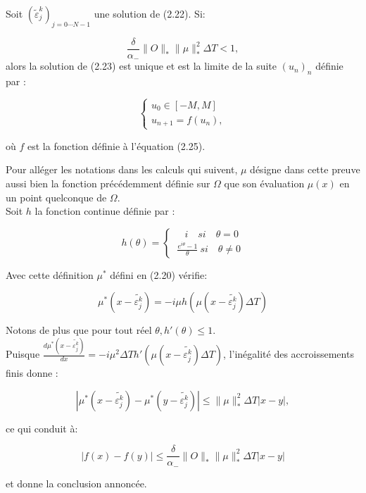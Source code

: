 \begin{theorem}
	Soit $(\tilde{\varepsilon}_j^k)_{j = 0\cdots N-1}$ une solution de (2.22). Si:
	
	\begin{equation}
	\frac{\delta}{\alpha_-} \lVert O\rVert_* \lVert \mu \rVert^2_* \Delta T < 1,
	\end{equation}
	alors la solution de (2.23) est unique et est la limite de la suite $(u_n )_n$ définie par :
	
	\begin{equation}
	\begin{cases}
	u_0 \in [-M,M]\\
	u_{n+1} = f(u_n),
	\end{cases}
	\end{equation}
	
	où $f$ est la fonction définie à l'équation (2.25).
	
\end{theorem}

\begin{ proof }
	
	Pour alléger les notations dans les calculs qui suivent, $\mu$ désigne dans cette preuve aussi bien la fonction précédemment définie sur $\Omega$ que son évaluation $\mu(x)$ en un point quelconque de $\Omega$.
	$ $
	\\Soit $h$ la fonction continue définie par :
	
	\begin{equation}
	h(\theta) = \begin{cases}
	\quad i \quad si \quad\theta = 0\\
	\ \frac{e^{i\theta}-1}{\theta}\ si\quad \theta \neq 0
	\end{cases}
	\end{equation}
	
	Avec cette définition $\mu^*$ défini en (2.20) vérifie:
	
	$$ \mu^*(x-\tilde{\varepsilon^k_j}) = -i\mu h (\mu(x-\tilde{\varepsilon^k_j}) \Delta T )$$
	
	Notons de plus que pour tout réel $ \theta, h'(\theta) \leq 1 $.
	\\Puisque $ \frac{d\mu^* (x-\tilde{\varepsilon^k_j})}{dx} = -i\mu^2 \Delta T h' (\mu(x-\tilde{\varepsilon^k_j})\Delta T) $, l'inégalité des accroissements finis donne :
	
	$$ |\mu^* (x-\tilde{\varepsilon^k_j}) - \mu^* (y-\tilde{\varepsilon^k_j})| \leq \lVert \mu \rVert _*^2 \Delta T |x-y|,  $$
	
	ce qui conduit à:
	
	$$ |f(x) - f(y)| \leq \frac{\delta}{\alpha_-} \lVert O\rVert_* \lVert \mu \rVert _*^2 \Delta T |x-y| $$
	
	et donne la conclusion annoncée.
\end{ proof }


